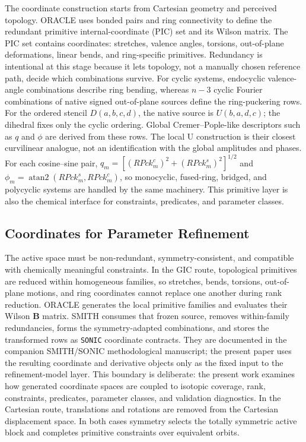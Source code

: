\documentclass[aip,jcp,reprint,longbibliography,floatfix]{revtex4-2}
\begin{document}
The coordinate construction starts from Cartesian geometry and perceived
topology. ORACLE uses bonded pairs and ring connectivity to define the
redundant primitive internal-coordinate (PIC) set and its Wilson matrix. The
PIC set contains
coordinates:  stretches, valence angles, torsions, out-of-plane deformations,
linear bends, and ring-specific primitives. Redundancy is intentional at this
stage because it lets topology, not a manually chosen reference path, decide
which combinations survive. For cyclic systems, endocyclic valence-angle
combinations describe ring bending, whereas \(n-3\) cyclic Fourier
combinations of native signed out-of-plane sources define the ring-puckering
rows. For the ordered stencil \(D(a,b,c,d)\), the native source is
\(U(b,a,d,c)\); the dihedral fixes only the cyclic ordering. Global
Cremer--Pople-like descriptors such as $q$ and $\phi$ are derived from these
rows. The local U construction is their closest curvilinear analogue, not an
identification with the global amplitudes and phases.  For each cosine--sine
pair, \(q_m=[(RPck_m^c)^2+(RPck_m^s)^2]^{1/2}\) and
\(\phi_m=\operatorname{atan2}(RPck_m^s,RPck_m^c)\), so
monocyclic, fused-ring, bridged, and polycyclic systems are handled by the
same machinery.\cite{CremerPople1975} This
primitive layer is also the chemical interface for constraints, predicates,
and parameter classes.


\subsection{Coordinates for Parameter Refinement}

The active space must be non-redundant, symmetry-consistent, and compatible
with chemically meaningful constraints. In the GIC route, topological
primitives are reduced within homogeneous families, so stretches, bends,
torsions, out-of-plane motions, and ring coordinates cannot replace one
another during rank reduction.\cite{PulayFogarasi1992,Peng1996Redundant,Baker1996Delocalized,BakkenHelgaker2002,Marenich2025GIC}
ORACLE generates the local primitive families and evaluates their Wilson
$\mathbf{B}$ matrix. SMITH consumes that frozen source, removes within-family
redundancies, forms the symmetry-adapted combinations, and stores the
transformed rows as \texttt{SONIC} coordinate contracts. They are documented in
the companion SMITH/SONIC methodological manuscript;
the present paper uses the resulting coordinate and derivative objects only as
the fixed input to the refinement-model layer. This boundary is deliberate: the
present work examines how generated coordinate spaces are coupled to isotopic
coverage, rank, constraints, predicates, parameter classes, and validation
diagnostics.
In the Cartesian route, translations and rotations are removed from the
Cartesian displacement space. In both cases symmetry selects the totally
symmetric active block and completes primitive constraints over equivalent
orbits.
\end{document}
